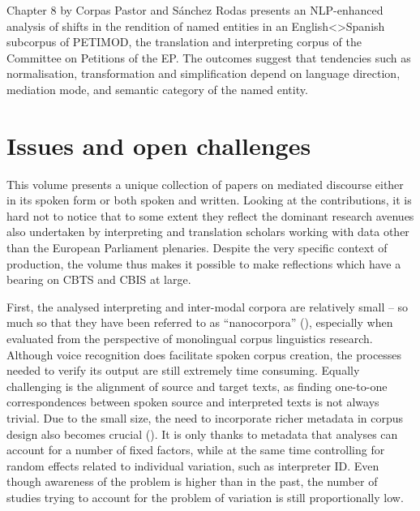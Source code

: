 \documentclass[output=paper]{langscibook}
\begin{document}
Chapter 8 by Corpas Pastor and Sánchez Rodas presents an NLP-enhanced analysis of shifts in the rendition of named entities in an English<>Spanish subcorpus of PETIMOD, the translation and interpreting corpus of the Committee on Petitions of the EP. The outcomes suggest that tendencies such as normalisation, transformation and simplification depend on language direction, mediation mode, and semantic category of the named entity.

\section{Issues and open challenges}

This volume presents a unique collection of papers on mediated discourse either in its spoken form or both spoken and written. Looking at the contributions, it is hard not to notice that to some extent they reflect the dominant research avenues also undertaken by interpreting and translation scholars working with data other than the European Parliament plenaries. Despite the very specific context of production, the volume thus makes it possible to make reflections which have a bearing on CBTS and CBIS at large.

First, the analysed interpreting and inter-modal corpora are relatively small -- so much so that they have been referred to as “nanocorpora” (\citealt{CollardDefrancq2016}), especially when evaluated from the perspective of monolingual corpus linguistics research. Although voice recognition does facilitate spoken corpus creation, the processes needed to verify its output are still extremely time consuming. Equally challenging is the alignment of source and target texts, as finding one-to-one correspondences between spoken source and interpreted texts is not always trivial. Due to the small size, the need to incorporate richer metadata in corpus design also becomes crucial (\citealt{ReynaertEtAl2021}). It is only thanks to metadata that analyses can account for a number of fixed factors, while at the same time controlling for random effects related to individual variation, such as interpreter ID. Even though awareness of the problem is higher than in the past, the number of studies trying to account for the problem of variation is still proportionally low.
\end{document}
